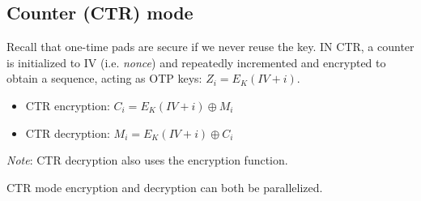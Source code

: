 \subsection{Counter (CTR) mode}
Recall that one-time pads are secure if we never reuse the key. IN CTR, a counter is initialized to IV (i.e. \emph{nonce}) and repeatedly incremented and encrypted to obtain a sequence, acting as OTP keys: $Z_i = E_K(IV + i)$.

\begin{itemize}
    \item CTR encryption: $C_i = E_K(IV + i) \oplus M_i$
    \item CTR decryption: $M_i = E_K(IV + i) \oplus C_i$
\end{itemize}

\medskip

\emph{Note}: CTR decryption also uses the encryption function.

\medskip

CTR mode encryption and decryption can both be parallelized.
